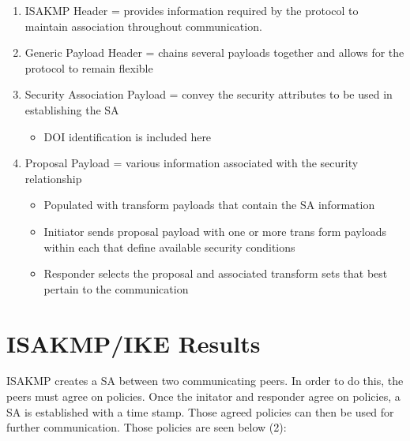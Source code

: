 \documentclass[10pt]{report}
\newcommand{\squash}{\itemsep=0pt\parskip=0pt}
\begin{document}
\begin{enumerate}
  \squash
              \item ISAKMP Header = provides information required by the protocol to
                maintain association throughout communication.
              \item Generic Payload Header = chains several payloads together and allows
                for the protocol 
    		to remain flexible
              \item Security Association Payload = convey the security attributes to be
                used in establishing
  		the SA
		\begin{itemize}
		\squash
		\item DOI identification is included here
		\end{itemize}
              \item Proposal Payload = various information associated with the security
                relationship
  		\begin{itemize}
		\squash
	      \item Populated with transform payloads that contain the SA
                information
	      \item Initiator sends proposal payload with one or more trans
                form payloads within each that define available security conditions
	      \item Responder selects the proposal and associated transform
                         sets that best pertain
			 to the communication
		\end{itemize}
\end{enumerate}

\section{ISAKMP/IKE Results}

ISAKMP creates a SA between two communicating peers. In order to do this,
the peers must agree on policies. Once the initator and responder agree
on policies, a SA is established with a time stamp. Those agreed policies
can then be used for further communication. Those policies are seen below (2):
\end{document}
